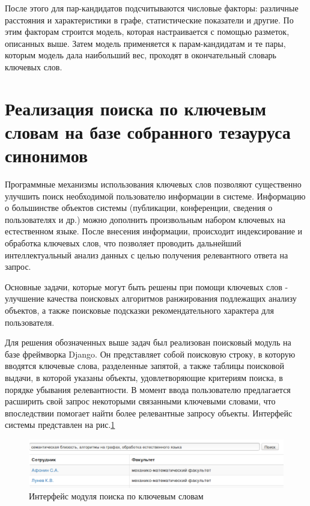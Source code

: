 После этого для пар-кандидатов подсчитываются числовые факторы: различные расстояния и характеристики в графе, статистические показатели и другие. По этим факторам строится модель, которая настраивается с помощью разметок, описанных выше. Затем модель применяется к парам-кандидатам и те пары, которым модель дала наибольший вес, проходят в окончательный словарь ключевых слов.


\section{Реализация поиска по ключевым словам на базе собранного тезауруса синонимов}
Программные механизмы использования ключевых слов позволяют существенно улучшить поиск необходимой пользователю информации в системе. Информацию о большинстве объектов системы (публикации, конференции, сведения о пользователях и др.) можно дополнить произвольным набором ключевых на естественном языке. После внесения информации, происходит индексирование и обработка ключевых слов, что позволяет проводить дальнейший интеллектуальный анализ данных с целью получения релевантного ответа на запрос.

Основные задачи, которые могут быть решены при помощи ключевых слов - улучшение качества поисковых алгоритмов ранжирования подлежащих анализу объектов, а также поисковые подсказки рекомендательного характера для пользователя.

Для решения обозначенных выше задач был реализован поисковый модуль на базе фреймворка Django. Он представляет собой поисковую строку, в которую вводятся ключевые слова, разделенные запятой, а также таблицы поисковой выдачи, в которой указаны объекты, удовлетворяющие критериям поиска, в порядке убывания релевантности. В момент ввода пользователю предлагается расширить свой запрос некоторыми связанными ключевыми словами, что впоследствии помогает найти более релевантные запросу объекты. Интерфейс системы представлен на рис.\ref{img:search}

\begin{figure}[ht]
  \begin{minipage}[ht]{1.0\linewidth}\centering
    \includegraphics[width=0.95\linewidth]{Dissertation/pics/search}
    \caption{Интерфейс модуля поиска по ключевым словам}
  \end{minipage}
  \label{img:search}
\end{figure}

